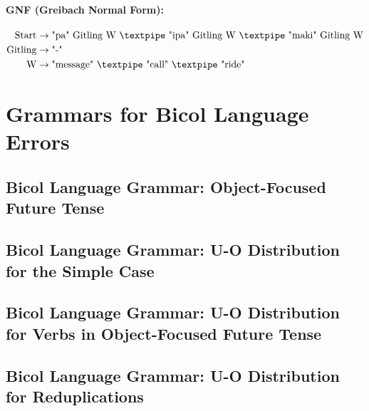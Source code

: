 \paragraph{GNF (Greibach Normal Form):}

\begin{equation*}
    \begin{aligned}
        \text{Start}   & \rightarrow \text{"pa" Gitling W {\textpipe} "ipa" Gitling W {\textpipe} "maki" Gitling W}\\
        \text{Gitling} & \rightarrow \text{"-"}\\
        \text{W} & \rightarrow \text{"message" {\textpipe} "call" {\textpipe} "ride"}   \\
    \end{aligned}
\end{equation*}

\section{Grammars for Bicol Language Errors}
\subsection{Bicol Language Grammar: Object-Focused Future Tense}
\subsection{Bicol Language Grammar: U-O Distribution for the Simple Case}
\subsection{Bicol Language Grammar: U-O Distribution for Verbs in Object-Focused Future Tense}
\subsection{Bicol Language Grammar: U-O Distribution for Reduplications}
